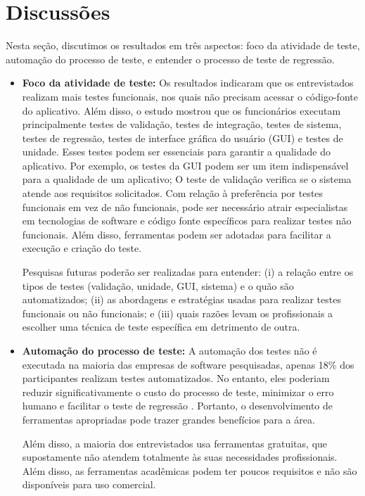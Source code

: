 \section{Discussões}\label{discussions}

Nesta seção, discutimos os resultados em três aspectos: foco da atividade de teste, automação do processo de teste, e entender o processo de teste de regressão.

\begin{itemize}
\item \textbf{Foco da atividade de teste:} Os resultados indicaram que os entrevistados realizam mais testes funcionais, nos quais não precisam acessar o código-fonte do aplicativo. Além disso, o estudo mostrou que os funcionários executam principalmente testes de validação, testes de integração, testes de sistema, testes de regressão, testes de interface gráfica do usuário (GUI) e testes de unidade. Esses testes podem ser essenciais para garantir a qualidade do aplicativo. Por exemplo, os testes da GUI podem ser um item indispensável para a qualidade de um aplicativo; O teste de validação verifica se o sistema atende aos requisitos solicitados. Com relação à preferência por testes funcionais em vez de não funcionais, pode ser necessário atrair especialistas em tecnologias de software e código fonte específicos para realizar testes não funcionais. Além disso, ferramentas podem ser adotadas para facilitar a execução e criação do teste.

Pesquisas futuras poderão ser realizadas para entender: (i) a relação entre os tipos de testes (validação, unidade, GUI, sistema) e o quão são automatizados; (ii) as abordagens e estratégias usadas para realizar testes funcionais ou não funcionais; e (iii) quais razões levam os profissionais a escolher uma técnica de teste específica em detrimento de outra.
    
\item \textbf{Automação do processo de teste:} A automação dos testes não é executada na maioria das empresas de software pesquisadas, apenas 18\% dos participantes realizam testes automatizados. No entanto, eles poderiam reduzir significativamente o custo do processo de teste, minimizar o erro humano e facilitar o teste de regressão \cite{Ammann:2008:IST:1355340}. Portanto, o desenvolvimento de ferramentas apropriadas pode trazer grandes benefícios para a área.

Além disso, a maioria dos entrevistados usa ferramentas gratuitas, que supostamente não atendem totalmente às suas necessidades profissionais. Além disso, as ferramentas acadêmicas podem ter poucos requisitos e não são disponíveis para uso comercial.


\end{itemize}
